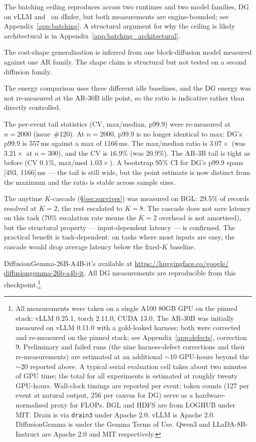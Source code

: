 The batching ceiling reproduces across two runtimes and two model
families, DG on vLLM and \LLaDA\ on dInfer, but both measurements
are engine-bounded; see
Appendix~\ref{app:batching}. A structural argument for why the ceiling
is likely architectural is in Appendix~\ref{app:batching_architectural}.

The cost-shape generalisation is inferred from one block-diffusion
model measured against one AR family. The shape claim is structural but
not tested on a second diffusion family.

The energy comparison uses three different idle baselines, and the DG
energy was not re-measured at the AR-30B idle point, so the ratio is
indicative rather than directly controlled.

The per-event tail statistics (CV, max/median, p99.9) were re-measured
at $n{=}2000$ (issue~\#120). At $n{=}2000$, p99.9 is no longer identical
to max: DG's p99.9 is 557\,ms against a max of 1166\,ms. The
max/median ratio is $3.07\times$ (was $3.21\times$ at $n{=}300$),
and the CV is $16.9\%$ (was $20.9\%$). The AR-3B tail is tight as
before (CV $0.1\%$, max/med $1.03\times$). A bootstrap 95\% CI for
DG's p99.9 spans [493, 1166]\,ms --- the tail is still wide, but the
point estimate is now distinct from the maximum and the ratio is
stable across sample sizes.

The anytime $K$-cascade (\S\ref{sec:survives}) was measured on BGL:
29.5\% of records resolved at $K{=}2$, the rest escalated to $K{=}8$.
The cascade does not save latency on this task (70\% escalation rate
means the $K{=}2$ overhead is not amortised), but the structural
property --- input-dependent latency --- is confirmed. The practical
benefit is task-dependent: on tasks where most inputs are easy, the
cascade would drop average latency below the fixed-$K$ baseline.

DiffusionGemma-26B-A4B-it's available at
\url{https://huggingface.co/google/}\\\url{diffusiongemma-26b-a4b-it}.
All DG measurements are reproducible from this checkpoint.\footnote{All
measurements were taken on a single A100 80GB GPU on the pinned stack:
vLLM 0.25.1, torch 2.11.0, CUDA 13.0. The AR-30B was initially
measured on vLLM 0.11.0 with a gold-leaked harness; both were corrected
and re-measured on the pinned stack; see Appendix~\ref{app:defects},
correction 9. Preliminary and failed runs (the nine harness-defect
corrections and their re-measurements) are estimated at an additional
$\sim$10 GPU-hours beyond the $\sim$20 reported above. A typical serial
evaluation cell takes about two minutes of GPU time; the total for all
experiments is estimated at roughly twenty GPU-hours. Wall-clock
timings are reported per event; token counts (127 per event at natural
output, 256 per canvas for DG) serve as a hardware-normalised proxy
for FLOPs. BGL and HDFS are from LOGHUB under MIT. Drain is via
\texttt{drain3} under Apache 2.0. vLLM is Apache 2.0. DiffusionGemma
is under the Gemma Terms of Use. Qwen3 and LLaDA-8B-Instruct are
Apache 2.0 and MIT respectively.}

